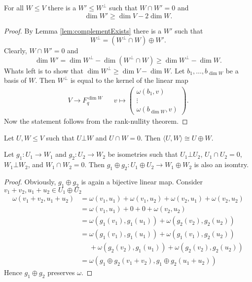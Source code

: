 \begin{lemma}\label{lem:largeOrthogonal}
For all $W\leq V$ there is a $W'\leq W^\bot$ such that $W\cap W'=0$ and \[\dim W'\geq \dim V-2\dim W.\]
\end{lemma}
\begin{proof}
By Lemma \ref{lem:complementExists} there is a $W'$ such that 
\[W^\bot=(W^\bot\cap W)\oplus W'.\]
Clearly, $W\cap W'=0$ and 
\[\dim W'=\dim W^\bot - \dim (W^\bot\cap W)\geq \dim W^\bot- \dim W.\]
Whats left is to show that $\dim W^\bot\geq \dim V-\dim W$. Let $b_1,\dots, b_{\dim W}$ be a basis of $W$. Then $W^\bot$ is equal to the kernel of the linear map 
\begin{align*}
V\to F_q^{\dim W}&& v\mapsto
\begin{pmatrix}
\omega(b_1,v)\\
\vdots\\
\omega(b_{\dim W},v)
\end{pmatrix}.
\end{align*}
Now the statement follows from the rank-nullity theorem.
\end{proof}


\begin{lemma}
Let $U,W\leq V$ such that $U\bot W$ and $U\cap W=0$. Then $\langle U,W\rangle\cong U\oplus W$.
\end{lemma}
\begin{lemma}\label{lem:isomSum}
Let $g_1\colon U_1\to W_1$ and $g_2\colon U_2\to W_2$ be isometries such that $U_1\bot U_2$, $U_1\cap U_2=0$, $W_1\bot W_2$, and $W_1\cap W_2=0$.
Then $g_1\oplus g_2\colon U_1\oplus U_2\to W_1\oplus W_2$ is also an isomtry.
\end{lemma}
\begin{proof}
Obviously, $g_1\oplus g_2$ is again a bijective linear map. Consider $v_1+v_2, u_1+u_2\in U_1\oplus U_2$
\begin{align*}
\omega(v_1+v_2, u_1+u_2)&=\omega(v_1, u_1)+\omega(v_1, u_2)+\omega(v_2, u_1)+\omega(v_2, u_2)\\
&=\omega(v_1, u_1)+0+0+\omega(v_2, u_2) \tag{$U_1\bot U_2$}\\
&=\omega(g_1(v_1), g_1(u_1))+\omega(g_2(v_2), g_2(u_2))\\
&=\omega(g_1(v_1), g_1(u_1))+\omega(g_1(v_1), g_2(u_2))\\ &\phantom{={}}+\omega(g_2(v_2), g_1(u_1))+\omega(g_2(v_2), g_2(u_2))\tag{$W_1\bot W_2$}\\
&=\omega(g_1\oplus g_2(v_1+v_2), g_1\oplus g_2(u_1+u_2))
\end{align*}
Hence $g_1\oplus g_2$ preserves $\omega$.
\end{proof}

